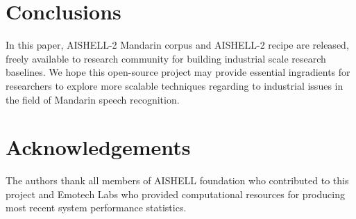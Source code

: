 \documentclass[a4paper]{article}
\begin{document}
% 

\section{Conclusions}

In this paper, AISHELL-2 Mandarin corpus and AISHELL-2 recipe are released,
freely available to research community for building industrial scale research
baselines. We hope this open-source project may provide essential ingradients for
researchers to explore more scalable techniques regarding to industrial issues in the field of Mandarin speech recognition.

\section{Acknowledgements}

The authors thank all members of AISHELL foundation who contributed to this project and Emotech Labs who provided computational resources for producing most recent system performance statistics.





\end{document}
